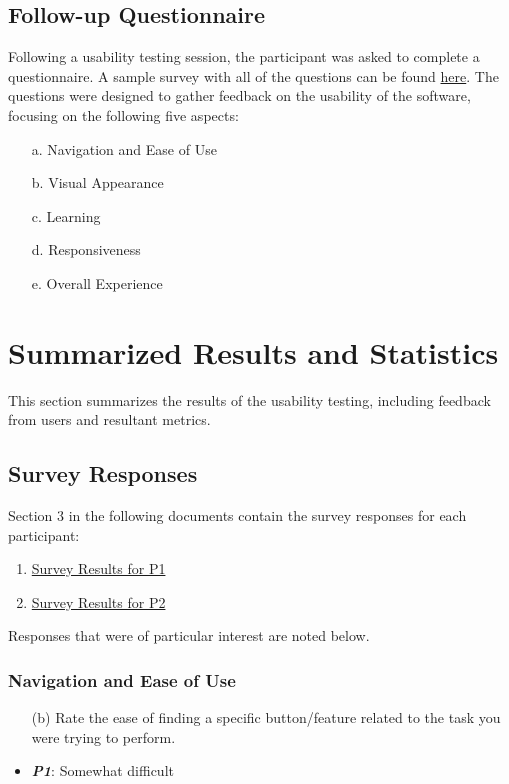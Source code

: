 \documentclass{article}
\begin{document}
\subsection{Follow-up Questionnaire}
Following a usability testing session, the participant was asked to complete a
questionnaire. A sample survey with all of the questions can be found
\href{https://github.com/SumanyaG/Alkalytics/blob/main/docs/UsabilityTestingReport/Survey/SampleSurvey.pdf}{here}.
The questions were designed to gather feedback on the usability of the
software, focusing on the following five aspects:
\begin{itemize}
    \item[a.] Navigation and Ease of Use
    \item[b.] Visual Appearance
    \item[c.] Learning
    \item[d.] Responsiveness
    \item[e.] Overall Experience
\end{itemize}

\section{Summarized Results and Statistics}
This section summarizes the results of the usability testing, including feedback
from users and resultant metrics.

\subsection{Survey Responses}
Section 3 in the following documents contain the survey responses for each
participant:
\begin{enumerate}
    \item
    \href{https://github.com/SumanyaG/Alkalytics/blob/main/docs/UsabilityTestingReport/Survey/SurveyResults/CharlesDeLannoy/UsabilityTestingSurveyDeLannoy.pdf}{Survey Results for P1}
    \item
    \href{https://github.com/SumanyaG/Alkalytics/blob/main/docs/UsabilityTestingReport/Survey/SurveyResults/MeghnaSaha/UsabilityTestingSurveySaha.pdf}{Survey
    Results for P2}
\end{enumerate}

Responses that were of particular interest are noted below.

\subsubsection{Navigation and Ease of Use}
\begin{itemize}
    \item[(b)] Rate the ease of finding a specific button/feature related to the
    task you were trying to perform.
    \item \textbf{\emph{P1}}: Somewhat difficult
\end{itemize}
\end{document}
